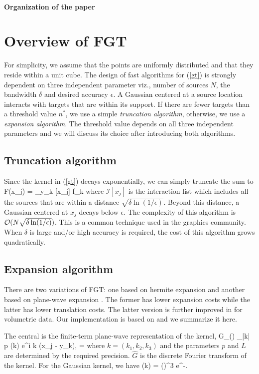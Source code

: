 \documentclass[conference]{IEEEtran}
\begin{document}
\paragraph{Organization of the paper}


\section{Overview of FGT}
For simplicity, we assume that the points are uniformly distributed and that they reside within a unit cube.
The design of fast algorithms for (\ref{gt}) is strongly dependent on three independent parameter viz., number of sources $N$, the bandwidth $\delta$ and desired accuracy $\epsilon$. A Gaussian centered at a source location interacts with targets that are within its support. If there are fewer targets than a threshold value $n^*$, we use a simple {\em truncation algorithm}, otherwise, we use a {\em expansion algorithm}. The threshold  value depends on all three independent parameters and we will discuss its choice after introducing both algorithms. 

\subsection{Truncation algorithm} 
Since the kernel in (\ref{gt}) decays exponentially, we can simply truncate the sum to
%
\beq F(x_j) = \sum_{y_k \in {}[x_j]}  f_k \eeq
%
where $\mathcal{I}[x_j]$ is the interaction list which includes all the sources that are within a distance $\sqrt{\delta \ln (1/\epsilon)}$. Beyond this distance, a Gaussian centered at $x_j$ decays below $\epsilon$. The complexity of this algorithm is $\mathcal{O}(N \sqrt{\delta \ln(1/\epsilon)})$. This is a common technique used in the graphics community. When $\delta$ is large and/or high accuracy is required, the cost of this algorithm grows quadratically.  

\subsection{Expansion algorithm}
There are two variations of FGT: one based on hermite expansion \cite{fgt} and another based on plane-wave expansion \cite{greengard98}. The former has lower expansion costs while the latter has lower translation costs. The latter version is further improved in \cite{fggt} for volumetric data. Our implementation is based on \cite{fggt} and we summarize it here. 

The central is the finite-term plane-wave representation of the kernel,
\beq G_\delta() \approx \sum_{|k| \leq p} (k) e^{i \lambda k \cdot (x_j - y_k)}, \quad \lambda = \eeq
where $k = (k_1, k_2, k_3)$ and the parameters $p$ and $L$ are determined by the required precision. $\hat{G}$ is the discrete Fourier transform of the kernel. For the Gaussian kernel, we have 
\beq {}(k) = \left(\right)^3 e^{-}.\eeq
\end{document}
